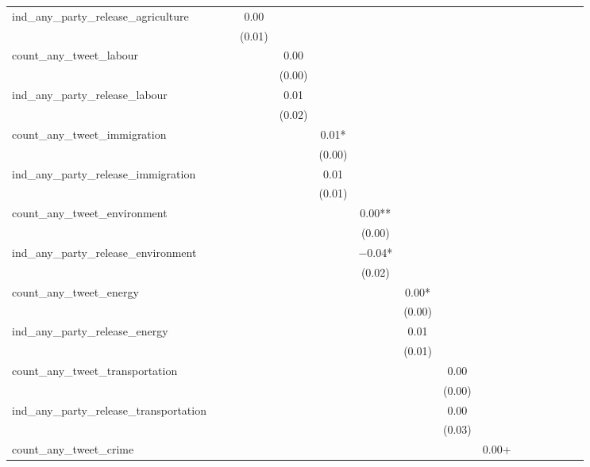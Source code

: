 \begin{table}
\begin{tabular}[t]{lccccccccccccccc}
ind\_any\_party\_release\_agriculture &  &  & \num{0.00} &  &  &  &  &  &  &  &  &  &  &  & \\
 &  &  & (\num{0.01}) &  &  &  &  &  &  &  &  &  &  &  & \\
count\_any\_tweet\_labour &  &  &  & \num{0.00} &  &  &  &  &  &  &  &  &  &  & \\
 &  &  &  & (\num{0.00}) &  &  &  &  &  &  &  &  &  &  & \\
ind\_any\_party\_release\_labour &  &  &  & \num{0.01} &  &  &  &  &  &  &  &  &  &  & \\
 &  &  &  & (\num{0.02}) &  &  &  &  &  &  &  &  &  &  & \\
count\_any\_tweet\_immigration &  &  &  &  & \num{0.01}* &  &  &  &  &  &  &  &  &  & \\
 &  &  &  &  & (\num{0.00}) &  &  &  &  &  &  &  &  &  & \\
ind\_any\_party\_release\_immigration &  &  &  &  & \num{0.01} &  &  &  &  &  &  &  &  &  & \\
 &  &  &  &  & (\num{0.01}) &  &  &  &  &  &  &  &  &  & \\
count\_any\_tweet\_environment &  &  &  &  &  & \num{0.00}** &  &  &  &  &  &  &  &  & \\
 &  &  &  &  &  & (\num{0.00}) &  &  &  &  &  &  &  &  & \\
ind\_any\_party\_release\_environment &  &  &  &  &  & \num{-0.04}* &  &  &  &  &  &  &  &  & \\
 &  &  &  &  &  & (\num{0.02}) &  &  &  &  &  &  &  &  & \\
count\_any\_tweet\_energy &  &  &  &  &  &  & \num{0.00}* &  &  &  &  &  &  &  & \\
 &  &  &  &  &  &  & (\num{0.00}) &  &  &  &  &  &  &  & \\
ind\_any\_party\_release\_energy &  &  &  &  &  &  & \num{0.01} &  &  &  &  &  &  &  & \\
 &  &  &  &  &  &  & (\num{0.01}) &  &  &  &  &  &  &  & \\
count\_any\_tweet\_transportation &  &  &  &  &  &  &  & \num{0.00} &  &  &  &  &  &  & \\
 &  &  &  &  &  &  &  & (\num{0.00}) &  &  &  &  &  &  & \\
ind\_any\_party\_release\_transportation &  &  &  &  &  &  &  & \num{0.00} &  &  &  &  &  &  & \\
 &  &  &  &  &  &  &  & (\num{0.03}) &  &  &  &  &  &  & \\
count\_any\_tweet\_crime &  &  &  &  &  &  &  &  & \num{0.00}+ &  &  &  &  &  & \\

\end{tabular}
\end{table}
